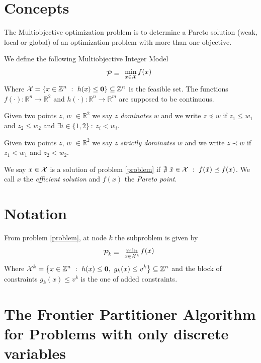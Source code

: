 \documentclass{article}
\def\setR{\mathbb{R}}
\def\setRn{\mathbb{R}^n}
\def\setZn{\mathbb{Z}^n}
\def\ds{\displaystyle}
\def\X{{\cal X}}
\begin{document}
	\section{Concepts}
	  The Multiobjective optimization problem is to determine a Pareto solution (weak, local or global) of an optimization problem with more than one objective. 
	
	We define the following Multiobjective Integer Model
	\begin{equation}\label{problem}
	{\cal P} =
	\begin{array}{ll}
	  \ds \min_{x \in \X} f(x)
	\end{array}
	\end{equation}
	Where $\ds \X = \left\{x \in \setZn \ :\ h(x) \le {\bf 0} \right\} \subseteq \setZn$ is the feasible set. The functions $f(\cdot): \setRn \rightarrow \setR^2$ and $ h(\cdot) : \setRn \rightarrow \setR^m$ are supposed to be continuous.
	
	Given two points $z$, $w$ $\in \setR^2$ we say $z$ \textit{dominates} $w$ and we write $z\preceq w $ if $z_1 \le w_1$ and $z_2 \le w_2$ and $\exists i \in \lbrace 1, 2 \rbrace \ : \ z_i < w_i$.
	
		Given two points $z$, $w$ $\in \setR^2$ we say $z$ \textit{strictly dominates} $w$ and we write $z\prec w $ if $z_1 < w_1$ and $z_2 < w_2$.
		
		We say  $x \in \X$ is a solution of problem  \eqref{problem} if $ \nexists\  \hat{x} \in \X \ : \ f(\hat{x}) \preceq f(x)$. We call $x$ the {\it efficient solution} and $f(x)$  the {\it Pareto point}.
	
	\section{Notation}
	From problem \eqref{problem}, at node $k$ the subproblem is given by
	\begin{equation}\label{subproblem}
		{\cal P}_k =
	\begin{array}{ll}
		\ds \min_{x \in \X^k} f(x)
	\end{array}
    \end{equation}
Where $\ds \X^k = \left\{x \in \setZn \ : \ h(x) \le {\bf 0},\ g_k(x) \le v^k \right\} \subseteq \setZn$ and the block of constraints $ g_k(x) \le v^k$ is the one of added constraints.
	
	
	\section{The Frontier Partitioner Algorithm for Problems with only discrete variables}
	
\end{document}

